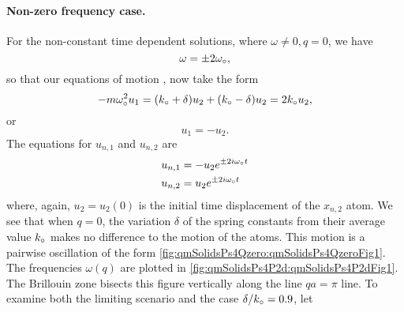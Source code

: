 {\paragraph{Non-zero frequency case.}
%
For the non-constant time dependent solutions, where \(\omega \ne 0, q = 0\), we have
%
\begin{dmath}\label{eqn:condensedMatterProblemSet4Problem2:560}
\omega = \pm 2 \omega_\nought,
\end{dmath}
%
so that our equations of motion , now take the form
%
\begin{dmath}\label{eqn:condensedMatterProblemSet4Problem2:640}
-m \omega_\nought^2 u_1
=
(k_\nought + \delta)
u_2
+ (k_\nought - \delta)
u_2
=
2 k_\nought
u_2,
\end{dmath}
%
or
%
\begin{dmath}\label{eqn:condensedMatterProblemSet4Problem2:660}
u_1 = -u_2.
\end{dmath}
%
The equations for \(u_{n, 1}\) and \(u_{n, 2}\) are
%
\begin{dmath}\label{eqn:condensedMatterProblemSet4Problem2:600}
\begin{aligned}
u_{n, 1} &= -u_2 e^{ \pm 2 i \omega_\nought t } \\
u_{n, 2} &= u_2 e^{ \pm 2 i \omega_\nought t }
\end{aligned}
\end{dmath}
%
where, again, \(u_2 = u_2(0)\) is the initial time displacement of the \(x_{n, 2}\) atom.  We see that when \(q = 0\), the variation \(\delta\) of the spring constants from their average value \(k_\circ\) makes no difference to the motion of the atoms.  This motion is a pairwise oscillation of the form \cref{fig:qmSolidsPs4Qzero:qmSolidsPs4QzeroFig1}.
The frequencies \(\omega(q)\) are plotted in \cref{fig:qmSolidsPs4P2d:qmSolidsPs4P2dFig1}.  The Brillouin zone bisects this figure vertically along the line \(q a = \pi\) line.
%
To examine both the limiting scenario and the case \(\delta/k_\circ = 0.9\), let
%
\begin{dmath}\label{eqn:condensedMatterProblemSet4Problem2:740}

\end{dmath}}
